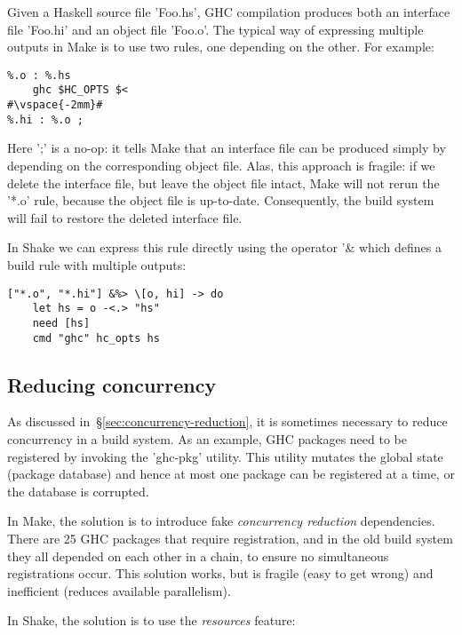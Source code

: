 Given a Haskell source file \lst'Foo.hs', GHC compilation produces both an
interface file \lst'Foo.hi' and an object file \lst'Foo.o'. The typical way of
expressing multiple outputs in Make is to use two rules, one depending
on the other. For example:

\begin{lstlisting}
%.o : %.hs
    ghc $HC_OPTS $<
#\vspace{-2mm}#
%.hi : %.o ;
\end{lstlisting}
\noindent Here \lst';' is a no-op: it tells Make that an interface file can be
produced simply by depending on the corresponding object file. Alas, this
approach is fragile: if we delete the interface file, but leave the object
file intact, Make will not rerun the \lst'*.o' rule, because the object file is
up-to-date. Consequently, the build system will fail to restore the deleted
interface file.

In Shake we can express this rule directly using the operator \lst'&%
which defines a build rule with multiple outputs:


\begin{lstlisting}
["*.o", "*.hi"] &%> \[o, hi] -> do
    let hs = o -<.> "hs"
    need [hs]
    cmd "ghc" hc_opts hs
\end{lstlisting}

\subsection{Reducing concurrency\label{sec:ghc-pkg-db}}

As discussed in~\S\ref{sec:concurrency-reduction}, it is sometimes necessary to
reduce concurrency in a build system. As an example, GHC packages need to
be registered by invoking the \lst'ghc-pkg' utility. This utility mutates the
global state (package database) and hence at most one package can be registered
at a time, or the database is corrupted.

In Make, the solution is to introduce fake \emph{concurrency
reduction} dependencies. There are 25 GHC packages that require registration,
and in the old build system they all depended on each other in a chain, to
ensure no simultaneous registrations occur. This solution works, but is
fragile (easy to get wrong) and inefficient (reduces available parallelism).

In Shake, the solution is to use the \emph{resources} feature:

